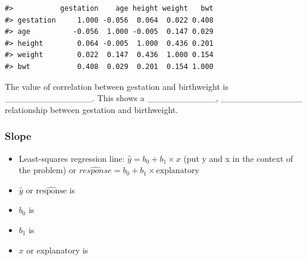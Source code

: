 \documentclass[
]{report}
\providecommand{\tightlist}{%
  \setlength{\itemsep}{0pt}\setlength{\parskip}{0pt}}
\begin{document}
\begin{verbatim}
#>           gestation    age height weight   bwt
#> gestation     1.000 -0.056  0.064  0.022 0.408
#> age          -0.056  1.000 -0.005  0.147 0.029
#> height        0.064 -0.005  1.000  0.436 0.201
#> weight        0.022  0.147  0.436  1.000 0.154
#> bwt           0.408  0.029  0.201  0.154 1.000
\end{verbatim}


The value of correlation between gestation and birthweight is \_\_\_\_\_\_\_\_\_\_\_\_\_\_. This shows a \_\_\_\_\_\_\_\_\_\_\_, \_\_\_\_\_\_\_\_\_\_\_\_\_ relationship between gestation and birthweight.


\subsubsection*{Slope}\label{slope}

\begin{itemize}
\item
  Least-squares regression line: \(\hat{y}=b_0+b_1\times x\) (put y and x in the context of the problem) or \(\widehat{response}=b_0+b_1 \times \text{explanatory}\)
\item
  \(\hat{y}\) or \(\widehat{\text{response}}\) is
\end{itemize}

\vspace{0.1in}

\begin{itemize}
\tightlist
\item
  \(b_0\) is
\end{itemize}

\vspace{0.1in}

\begin{itemize}
\tightlist
\item
  \(b_1\) is
\end{itemize}

\vspace{0.1in}

\begin{itemize}
\tightlist
\item
  \(x\) or explanatory is
\end{itemize}

\vspace{0.1in}
\end{document}
